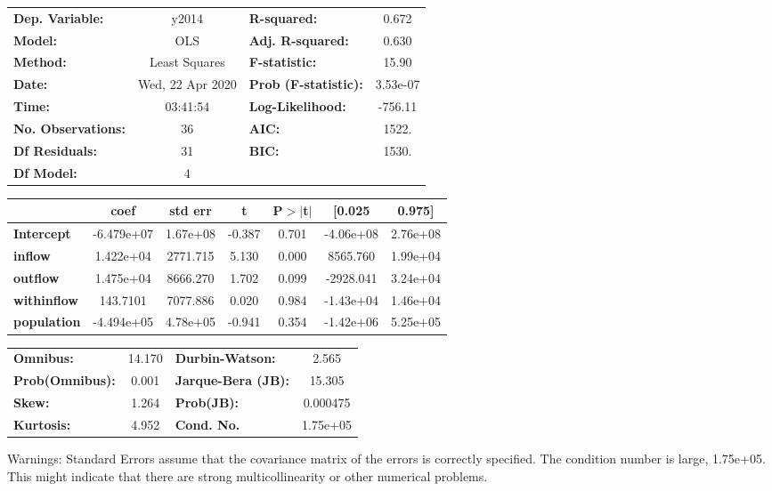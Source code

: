\begin{center}
\begin{tabular}{lclc}
\toprule
\textbf{Dep. Variable:}    &      y2014       & \textbf{  R-squared:         } &     0.672   \\
\textbf{Model:}            &       OLS        & \textbf{  Adj. R-squared:    } &     0.630   \\
\textbf{Method:}           &  Least Squares   & \textbf{  F-statistic:       } &     15.90   \\
\textbf{Date:}             & Wed, 22 Apr 2020 & \textbf{  Prob (F-statistic):} &  3.53e-07   \\
\textbf{Time:}             &     03:41:54     & \textbf{  Log-Likelihood:    } &   -756.11   \\
\textbf{No. Observations:} &          36      & \textbf{  AIC:               } &     1522.   \\
\textbf{Df Residuals:}     &          31      & \textbf{  BIC:               } &     1530.   \\
\textbf{Df Model:}         &           4      & \textbf{                     } &             \\
\bottomrule
\end{tabular}
\begin{tabular}{lcccccc}
                    & \textbf{coef} & \textbf{std err} & \textbf{t} & \textbf{P$> |$t$|$} & \textbf{[0.025} & \textbf{0.975]}  \\
\midrule
\textbf{Intercept}  &   -6.479e+07  &     1.67e+08     &    -0.387  &         0.701        &    -4.06e+08    &     2.76e+08     \\
\textbf{inflow}     &    1.422e+04  &     2771.715     &     5.130  &         0.000        &     8565.760    &     1.99e+04     \\
\textbf{outflow}    &    1.475e+04  &     8666.270     &     1.702  &         0.099        &    -2928.041    &     3.24e+04     \\
\textbf{withinflow} &     143.7101  &     7077.886     &     0.020  &         0.984        &    -1.43e+04    &     1.46e+04     \\
\textbf{population} &   -4.494e+05  &     4.78e+05     &    -0.941  &         0.354        &    -1.42e+06    &     5.25e+05     \\
\bottomrule
\end{tabular}
\begin{tabular}{lclc}
\textbf{Omnibus:}       & 14.170 & \textbf{  Durbin-Watson:     } &    2.565  \\
\textbf{Prob(Omnibus):} &  0.001 & \textbf{  Jarque-Bera (JB):  } &   15.305  \\
\textbf{Skew:}          &  1.264 & \textbf{  Prob(JB):          } & 0.000475  \\
\textbf{Kurtosis:}      &  4.952 & \textbf{  Cond. No.          } & 1.75e+05  \\
\bottomrule
\end{tabular}
\end{center}

Warnings: \newline
 [1] Standard Errors assume that the covariance matrix of the errors is correctly specified. \newline
 [2] The condition number is large, 1.75e+05. This might indicate that there are \newline
 strong multicollinearity or other numerical problems.